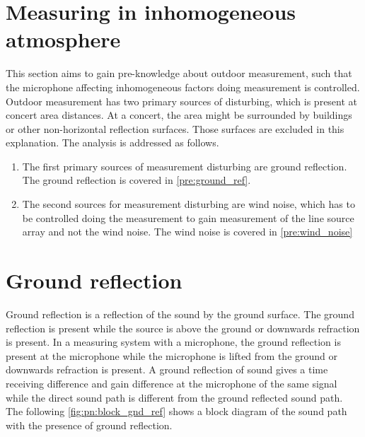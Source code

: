 \section{Measuring in inhomogeneous atmosphere}
This section aims to gain pre-knowledge about outdoor measurement, such that the microphone affecting inhomogeneous factors doing measurement is controlled. Outdoor measurement has two primary sources of disturbing, which is present at concert area distances. At a concert, the area might be surrounded by buildings or other non-horizontal reflection surfaces. Those surfaces are excluded in this explanation. The analysis is addressed as follows.  

\begin{enumerate}
\item The first primary sources of measurement disturbing are ground reflection. The ground reflection is covered in \autoref{pre:ground_ref}.
\item The second sources for measurement disturbing are wind noise, which has to be controlled doing the measurement to gain measurement of the line source array and not the wind noise. The wind noise is covered in \autoref{pre:wind_noise}
\end{enumerate}



\section{Ground reflection}\label{pre:ground_ref}
Ground reflection is a reflection of the sound by the ground surface. The ground reflection is present while the source is above the ground or downwards refraction is present. In a measuring system with a microphone, the ground reflection is present at the microphone while the microphone is lifted from the ground or downwards refraction is present. A ground reflection of sound gives a time receiving difference and gain difference at the microphone of the same signal while the direct sound path is different from the ground reflected sound path. The following \autoref{fig:pn:block_gnd_ref} shows a block diagram of the sound path with the presence of ground reflection.


\startexplain
{}
\stopexplain


